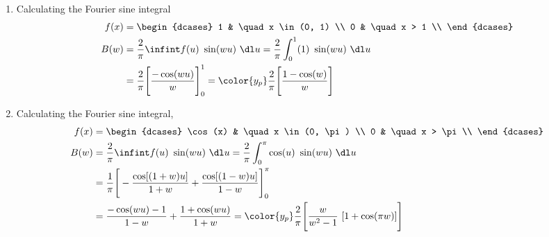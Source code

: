 \begin{enumerate}
    \item Calculating the Fourier sine integral
          \begin{align}
              f(x) & = \begin{dcases}
                           1 & \quad x \in (0, 1) \\
                           0 & \quad x > 1        \\
                       \end{dcases}                              \\
              B(w) & = \frac{2}{\pi} \infint f(u)\ \sin(wu)\ \dl u
              = \frac{2}{\pi} \int_{0}^{1} (1)\ \sin(wu)\ \dl u            \\
                   & = \frac{2}{\pi} \Bigg[ \frac{-\cos(wu)}{w} \Bigg]_0^1
              = \color{y_p} \frac{2}{\pi}\Bigg[ \frac{1 - \cos(w)}{w} \Bigg]
          \end{align}

    \item Calculating the Fourier sine integral,
          \begin{align}
              f(x) & = \begin{dcases}
                           \cos(x) & \quad x \in (0, \pi) \\
                           0       & \quad x > \pi        \\
                       \end{dcases}                       \\
              B(w) & = \frac{2}{\pi} \infint f(u)\ \sin(wu)\ \dl u
              = \frac{2}{\pi} \int_{0}^{\pi} \cos(u)\ \sin(wu)\ \dl u       \\
                   & = \frac{1}{\pi}\Bigg[-\frac{\cos[(1+w)u]}{1+w}
              + \frac{\cos[(1-w)u]}{1-w}\Bigg]_0^\pi                        \\
                   & = \frac{-\cos(wu) - 1}{1-w} + \frac{1 + \cos(wu)}{1+w}
              =  \color{y_p}
              \frac{2}{\pi} \Bigg[ \frac{w}{w^2 - 1}\ [1 + \cos(\pi w)] \Bigg]
          \end{align}


\end{enumerate}

